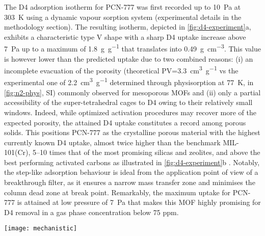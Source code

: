 The D4 adsorption isotherm for PCN-777 was first recorded up to \SI{10}{\pascal}
at \SI{303}{\kelvin} using a dynamic vapour sorption system (experimental
details in the methodology section). The resulting isotherm, depicted in
\cref{fig:d4-experiment}a, exhibits a characteristic type V shape
\citep{thommesPhysisorptionGasesSpecial2015} with a sharp D4 uptake increase
above \SI{7}{\pascal} up to a maximum of \SI{1.8}{\gram\per\gram} that
translates into \SI{0.49}{\gram\per\centi\metre\cubed}. This value is however
lower than the predicted uptake due to two combined reasons: (i) an incomplete
evacuation of the porosity (theoretical PV=\SI{3.3}{\centi\metre\cubed\per\gram}
vs the experimental one of \SI{2.2}{\centi\metre\cubed\per\gram} determined
through  physisorption at \SI{77}{\kelvin}, in \cref{fig:n2-phys}, SI)
commonly observed for mesoporous MOFs
\citep{nelsonSupercriticalProcessingRoute2009, parkCrystalStructureGuest2007}
and (ii) only a partial accessibility of the super-tetrahedral cages to D4 owing
to their relatively small windows. Indeed, while optimized activation procedures
may recover more of the expected porosity, the attained D4 uptake constitutes a
record among porous solids. This positions PCN-777 as the crystalline porous
material with the highest currently known D4 uptake, almost twice higher than
the benchmark MIL-101(Cr), 5--10 times that of the most promising silicas and
zeolites, and above the best performing activated carbons as illustrated in
\cref{fig:d4-experiment}b \citep{wangRecentAdvancesTechnologies2019}. Notably,
the step-like adsorption behaviour is ideal from the application point of view
of a breakthrough filter, as it ensures a narrow mass transfer zone and
minimises the column dead zone at break point. Remarkably, the maximum uptake
for PCN-777 is attained at low pressure of \SI{7}{\pascal} that makes this MOF
highly promising for D4 removal in a gas phase concentration below 75 ppm.

\begin{widefigure}[htb]
    \centering
    \texttt{[image: mechanistic]}
    \caption{%
        Representative snapshots of the preferential sitting of D4 in the pores
        of PCN-777 at \SI{298}{\kelvin} for increasing loading at (a) 10\% with
        highlighted interactions distance between D4 and the MOF framework, and
        at (b) 40\%, (c) 65\%, and (d) 100\% fractional loading (\(\theta\)).
        Framework atoms (sticks) and D4 molecules (lines, and ball and sticks)
        are coded as Zr, N, O, Si, C, and H atoms in light blue, dark blue, red,
        yellow, dark grey, and light grey respectively. The separating distance
        is represented by dashed black lines and reported in Å.
    }\label{fig:d4-mechanistic}
\end{widefigure}

